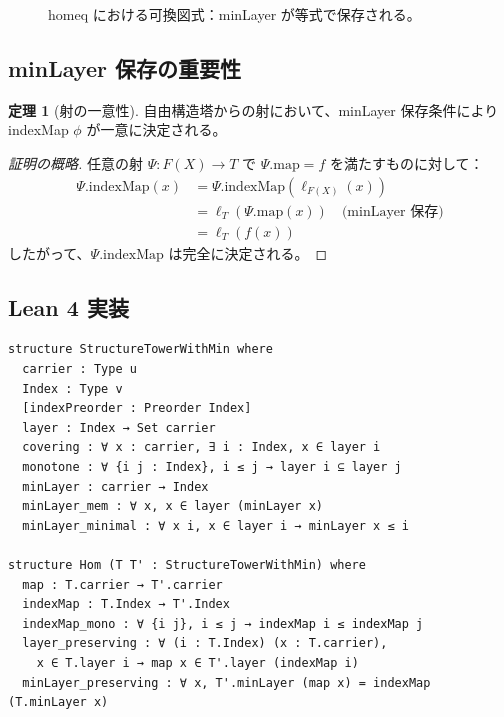 \documentclass{ltjsarticle}
\theoremstyle{definition}
\newtheorem{theorem}[definition]{定理}
\begin{document}
\begin{figure}[htbp]
\centering
{}
\caption{homeq における可換図式：minLayer が等式で保存される。}
\label{fig:homeq-commute}
\end{figure}

\subsection{minLayer 保存の重要性}

\begin{theorem}[射の一意性]
自由構造塔からの射において、minLayer 保存条件により indexMap $\phi$ が一意に決定される。
\end{theorem}

\begin{proof}[証明の概略]
任意の射 $\Psi: F(X) \to T$ で $\Psi.\mathrm{map} = f$ を満たすものに対して：
\begin{align*}
\Psi.\mathrm{indexMap}(x) &= \Psi.\mathrm{indexMap}(\ell_{F(X)}(x)) \\
&= \ell_T(\Psi.\mathrm{map}(x)) \quad \text{(minLayer 保存)} \\
&= \ell_T(f(x))
\end{align*}
したがって、$\Psi.\mathrm{indexMap}$ は完全に決定される。
\end{proof}

\subsection{Lean 4 実装}

\begin{leanbox}
\begin{lstlisting}
structure StructureTowerWithMin where
  carrier : Type u
  Index : Type v
  [indexPreorder : Preorder Index]
  layer : Index → Set carrier
  covering : ∀ x : carrier, ∃ i : Index, x ∈ layer i
  monotone : ∀ {i j : Index}, i ≤ j → layer i ⊆ layer j
  minLayer : carrier → Index
  minLayer_mem : ∀ x, x ∈ layer (minLayer x)
  minLayer_minimal : ∀ x i, x ∈ layer i → minLayer x ≤ i

structure Hom (T T' : StructureTowerWithMin) where
  map : T.carrier → T'.carrier
  indexMap : T.Index → T'.Index
  indexMap_mono : ∀ {i j}, i ≤ j → indexMap i ≤ indexMap j
  layer_preserving : ∀ (i : T.Index) (x : T.carrier),
    x ∈ T.layer i → map x ∈ T'.layer (indexMap i)
  minLayer_preserving : ∀ x, T'.minLayer (map x) = indexMap (T.minLayer x)
\end{lstlisting}
\end{leanbox}
\end{document}
